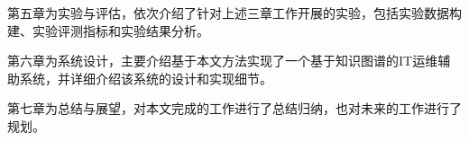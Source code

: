 第五章为实验与评估，依次介绍了针对上述三章工作开展的实验，包括实验数据构建、实验评测指标和实验结果分析。

第六章为系统设计，主要介绍基于本文方法实现了一个基于知识图谱的IT运维辅助系统，并详细介绍该系统的设计和实现细节。

第七章为总结与展望，对本文完成的工作进行了总结归纳，也对未来的工作进行了规划。







